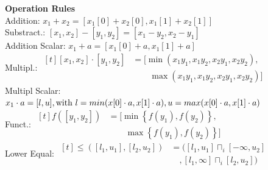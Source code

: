 \documentclass[11pt]{extarticle}
\begin{document}
\begin{multicols*}{3}
			\textbf{Operation Rules}\\
			Addition: $x_1+x_2 = [x_1[0] + x_2[0], x_1[1] + x_2[1]]$\\
			Substract.: $[x_1, x_2] - [y_1, y_2] = [x_1-y_2, x_2-y_1]$\\
			Addition Scalar: $x_1+a = [x_1[0] + a, x_1[1] +a]$\\
			Multipl.: $\begin{aligned}[t]  [x_1, x_2] \cdot [y_1, y_2] & = [\min(x_1 y_1,x_1 y_2,x_2 y_1,x_2 y_2), \\ 
			& \qquad \max(x_1 y_1,x_1 y_2,x_2 y_1,x_2 y_2)]\end{aligned}$\\
			Multipl Scalar: $x_1 \cdot a = [l, u], \\ 
			\text{with } l= min(x[0]\cdot a, x[1] \cdot a), u = max(x[0] \cdot a, x[1]\cdot a)$\\
			Funct.: $\begin{aligned}[t]
			f([y_{1},y_{2}]) & = [ \min \left\{f(y_{1}),f(y_{2})\right\},\\
			& \qquad \max \left\{f(y_{1}),f(y_{2})\right\} ] \end{aligned}$\\
			Lower Equal: $\begin{aligned}[t] \leq \left( \left[ l _ { 1 } , u _ { 1 } \right] , \left[ l _ { 2 } , u _ { 2 } \right] \right) & = ( \left[ l _ { 1 } , u _ { 1 } \right] \sqcap _ { i } \left[ - \infty , u _ { 2 } \right]  \\
			& \quad , \left[ l _ { 1 } , \infty \right] \sqcap _ { i } \left[ l _ { 2 } , u _ { 2 } \right])\end{aligned}$

\end{multicols*}
\end{document}
